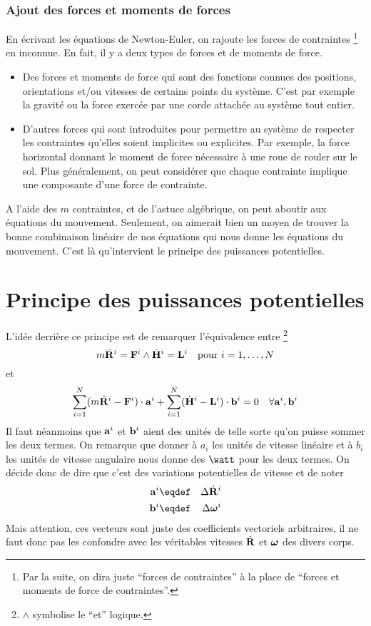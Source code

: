 \subsubsection{Ajout des forces et moments de forces}
En écrivant les équations de Newton-Euler, on rajoute les forces de contraintes
\footnote{Par la suite, on dira juste ``forces de contraintes'' à la place de ``forces et moments de force de contraintes''.}
en inconnue.
En fait, il y a deux types de forces et de moments de force.
\begin{itemize}
	\item Des forces et moments de force qui sont des fonctions connues des positions, orientations et/ou vitesses de certains points du système.
		C'est par exemple la gravité ou la force exercée par une corde attachée au système tout entier.
	\item D'autres forces qui sont introduites pour permettre au système de respecter les contraintes qu'elles soient implicites ou explicites.
		Par exemple, la force horizontal donnant le moment de force nécessaire à une roue de rouler sur le sol.
		Plus généralement, on peut considérer que chaque contrainte implique une composante d'une force de contrainte.
\end{itemize}

A l'aide des $m$ contraintes, et de l'astuce algébrique, on peut aboutir aux équations du mouvement.
Seulement, on aimerait bien un moyen de trouver la bonne combinaison linéaire de nos équations qui nous donne les équations du mouvement.
C'est là qu'intervient le principe des puissances potentielles.

\section{Principe des puissances potentielles}

L'idée derrière ce principe est de remarquer l'équivalence entre
\footnote{$\land$ symbolise le ``et'' logique.}
\[
m\ddot{\bf R}^i = {\bf F}^i \land
\dot{{\bf H}}^i = {\bf L}^i
\quad \text{pour } i = 1, \ldots, N
\]
et
\[
\sum_{i=1}^N (m\ddot{\bf R}^i - {\bf F}^i) \cdot {\bf a}^i +
\sum_{i=1}^N (\dot{{\bf H}}^i - {\bf L}^i) \cdot {\bf b}^i = 0
\quad \forall {\bf a}^i, {\bf b}^i
\]
Il faut néanmoins que ${\bf a}^i$ et ${\bf b}^i$ aient des unités de telle sorte qu'on puisse sommer les deux termes.
On remarque que donner à $a_i$ les unités de vitesse linéaire et à $b_i$ les unités de vitesse angulaire nous donne des $\watt$ pour les deux termes.
On décide donc de dire que
c'est des variations potentielles de vitesse et de noter
\begin{eqnarray*}
	\fv{a}^i &\eqdef& \Delta \xgd^i\\
	\fv{b}^i &\eqdef& \Delta \omegaf^i
\end{eqnarray*}
Mais attention, ces vecteurs sont juste des coefficients vectoriels arbitraires,
il ne faut donc pas les confondre avec les véritables vitesses $\dot{\bf R}$ et ${\bm \omega}$ des divers corps.

